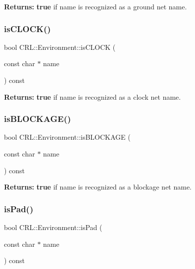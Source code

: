 {\bfseries Returns\+:} {\bfseries true} if {\ttfamily name} is recognized as a ground net name. \mbox{\label{classCRL_1_1Environment_a9ae0d48d88797a7a5421edf5978bf3d7}} 
\subsubsection{\texorpdfstring{is\+C\+L\+O\+C\+K()}{isCLOCK()}}
{\footnotesize\ttfamily bool C\+R\+L\+::\+Environment\+::is\+C\+L\+O\+CK (\begin{DoxyParamCaption}\item[{const char $\ast$}]{name }\end{DoxyParamCaption}) const}

{\bfseries Returns\+:} {\bfseries true} if {\ttfamily name} is recognized as a clock net name. \mbox{\label{classCRL_1_1Environment_a6f1ce36d1636f2ec701b0904f461e6b7}} 
\subsubsection{\texorpdfstring{is\+B\+L\+O\+C\+K\+A\+G\+E()}{isBLOCKAGE()}}
{\footnotesize\ttfamily bool C\+R\+L\+::\+Environment\+::is\+B\+L\+O\+C\+K\+A\+GE (\begin{DoxyParamCaption}\item[{const char $\ast$}]{name }\end{DoxyParamCaption}) const}

{\bfseries Returns\+:} {\bfseries true} if {\ttfamily name} is recognized as a blockage net name. \mbox{\label{classCRL_1_1Environment_a8a82d0a983c502e1dc97944ab496d8e5}} 
\subsubsection{\texorpdfstring{is\+Pad()}{isPad()}}
{\footnotesize\ttfamily bool C\+R\+L\+::\+Environment\+::is\+Pad (\begin{DoxyParamCaption}\item[{const char $\ast$}]{name }\end{DoxyParamCaption}) const}

